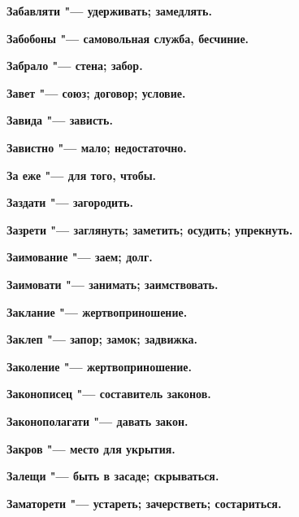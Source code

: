 \begin{multicols}{2}
\bfseries Забавляти\normalfont{} "--- удерживать; замедлять. 




\bfseries Забобоны\normalfont{} "--- самовольная служба, бесчиние. 




\bfseries Забрало\normalfont{} "--- стена; забор. 




\bfseries Завет\normalfont{} "--- союз; договор; условие. 




\bfseries Завида\normalfont{} "--- зависть. 




\bfseries Завистно\normalfont{} "--- мало; недостаточно. 




\bfseries За еже\normalfont{} "--- для того, чтобы. 




\bfseries Заздати\normalfont{} "--- загородить. 




\bfseries Зазрети\normalfont{} "--- заглянуть; заметить; осудить; упрекнуть. 




\bfseries Заимование\normalfont{} "--- заем; долг. 




\bfseries Заимовати\normalfont{} "--- занимать; заимствовать. 




\bfseries Заклание\normalfont{} "--- жертвоприношение. 




\bfseries Заклеп\normalfont{} "--- запор; замок; задвижка. 




\bfseries Заколение\normalfont{} "--- жертвоприношение. 




\bfseries Законописец\normalfont{} "--- составитель законов. 




\bfseries Законополагати\normalfont{} "--- давать закон. 




\bfseries Закров\normalfont{} "--- место для укрытия. 




\bfseries Залещи\normalfont{} "--- быть в засаде; скрываться. 




\bfseries Заматорети\normalfont{} "--- устареть; зачерстветь; состариться. 





\end{multicols}
